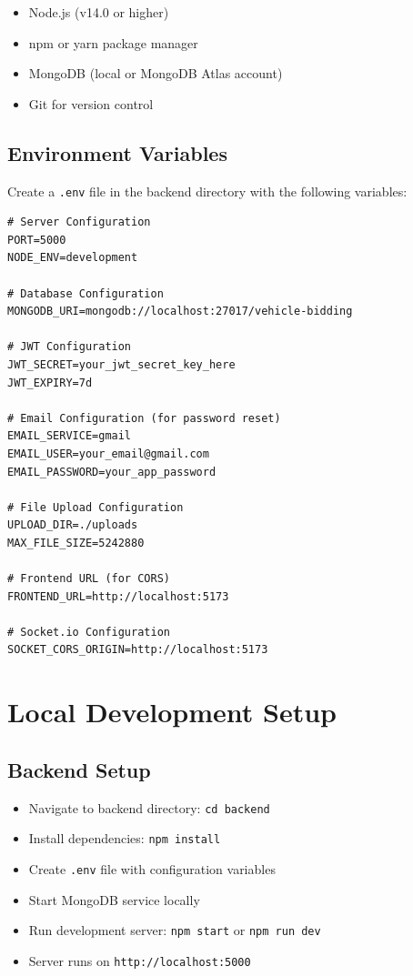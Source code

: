 \begin{itemize}
    \item Node.js (v14.0 or higher)
    \item npm or yarn package manager
    \item MongoDB (local or MongoDB Atlas account)
    \item Git for version control
\end{itemize}

\subsection{Environment Variables}

Create a \texttt{.env} file in the backend directory with the following variables:

\begin{verbatim}
# Server Configuration
PORT=5000
NODE_ENV=development

# Database Configuration
MONGODB_URI=mongodb://localhost:27017/vehicle-bidding

# JWT Configuration
JWT_SECRET=your_jwt_secret_key_here
JWT_EXPIRY=7d

# Email Configuration (for password reset)
EMAIL_SERVICE=gmail
EMAIL_USER=your_email@gmail.com
EMAIL_PASSWORD=your_app_password

# File Upload Configuration
UPLOAD_DIR=./uploads
MAX_FILE_SIZE=5242880

# Frontend URL (for CORS)
FRONTEND_URL=http://localhost:5173

# Socket.io Configuration
SOCKET_CORS_ORIGIN=http://localhost:5173
\end{verbatim}

\section{Local Development Setup}

\subsection{Backend Setup}

\begin{itemize}
    \item Navigate to backend directory: \texttt{cd backend}
    \item Install dependencies: \texttt{npm install}
    \item Create \texttt{.env} file with configuration variables
    \item Start MongoDB service locally
    \item Run development server: \texttt{npm start} or \texttt{npm run dev}
    \item Server runs on \texttt{http://localhost:5000}
\end{itemize}

